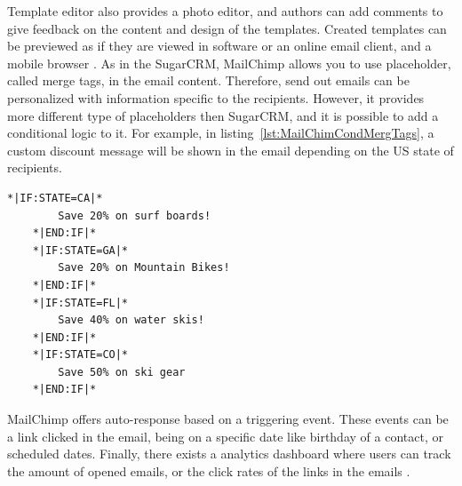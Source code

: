 Template editor also provides a photo editor, and authors can add comments to give feedback on the content and design of the templates. Created templates can be previewed as if they are viewed in software or an online email client, and a mobile browser \citep{TheRocketScienceGroupLLC2013a}. As in the SugarCRM, MailChimp allows you to use placeholder, called merge tags, in the email content. Therefore, send out emails can be personalized with information specific to the recipients. However, it provides more different type of placeholders then SugarCRM, and it is possible to add a conditional logic to it. For example, in listing~\ref{lst:MailChimCondMergTags}, a custom discount message will be shown in the email depending on the US state of recipients.
\vspace{1cm}


\begin{lstlisting}[float, language=XML, caption={[MailChimp's Conditional Merge Tags]MailChimp's Conditional Merge Tags \citep{TheRocketScienceGroupLLC2013b}}, label={lst:MailChimCondMergTags}]
	*|IF:STATE=CA|*
		Save 20% on surf boards!
	*|END:IF|* 
	*|IF:STATE=GA|*
		Save 20% on Mountain Bikes!
	*|END:IF|* 
	*|IF:STATE=FL|*
		Save 40% on water skis!
	*|END:IF|* 
	*|IF:STATE=CO|*
		Save 50% on ski gear
	*|END:IF|*
\end{lstlisting}

MailChimp offers auto-response based on a triggering event. These events can be a link clicked in the email, being on a specific date like birthday of a contact, or scheduled dates. Finally, there exists a analytics dashboard where users can track the amount of opened emails, or the click rates of the links in the emails \citep{TheRocketScienceGroupLLC2013c,TheRocketScienceGroupLLC2013d}.

